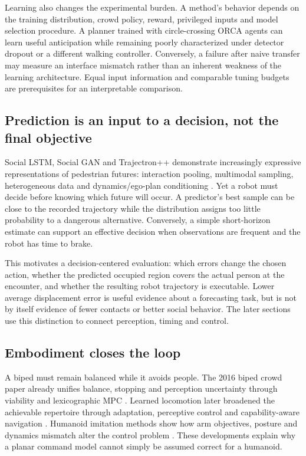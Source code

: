 Learning also changes the experimental burden. A method's behavior depends on
the training distribution, crowd policy, reward, privileged inputs and model
selection procedure. A planner trained with circle-crossing ORCA agents can
learn useful anticipation while remaining poorly characterized under detector
dropout or a different walking controller. Conversely, a failure after naive
transfer may measure an interface mismatch rather than an inherent weakness of
the learning architecture. Equal input information and comparable tuning budgets
are prerequisites for an interpretable comparison.

\subsection{Prediction is an input to a decision, not the final objective}
Social LSTM, Social GAN and Trajectron++ demonstrate increasingly expressive
representations of pedestrian futures: interaction pooling, multimodal sampling,
heterogeneous data and dynamics/ego-plan conditioning
\citep{sociallstm,socialgan,trajectron}. Yet a robot must decide before knowing
which future will occur. A predictor's best sample can be close to the recorded
trajectory while the distribution assigns too little probability to a dangerous
alternative. Conversely, a simple short-horizon estimate can support an effective
decision when observations are frequent and the robot has time to brake.

This motivates a decision-centered evaluation: which errors change the chosen
action, whether the predicted occupied region covers the actual person at the
encounter, and whether the resulting robot trajectory is executable. Lower
average displacement error is useful evidence about a forecasting task, but is
not by itself evidence of fewer contacts or better social behavior. The later
sections use this distinction to connect perception, timing and control.

\subsection{Embodiment closes the loop}
A biped must remain balanced while it avoids people. The 2016 biped crowd paper
already unifies balance, stopping and perception uncertainty through viability
and lexicographic MPC \citep{biped2016}. Learned locomotion later broadened the
achievable repertoire through adaptation, perceptive control and capability-aware
navigation \citep{rma,rough,parkour,wheeledleg}. Humanoid imitation methods show
how arm objectives, posture and dynamics mismatch alter the control problem
\citep{expressive,asap}. These developments explain why a planar command model
cannot simply be assumed correct for a humanoid.

